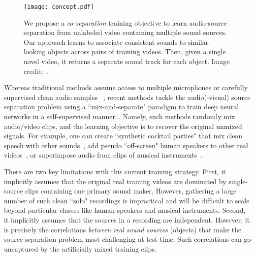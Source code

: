 \documentclass[10pt,twocolumn,letterpaper]{article}
\begin{document}
\begin{figure}
	\centering
	\texttt{[image: concept.pdf]}
	\caption{We propose a \emph{co-separation} training objective to learn audio-source separation from unlabeled video containing multiple sound sources.  Our approach learns to associate consistent sounds to similar-looking objects across pairs of training videos.  Then, given a single novel video, it returns a separate sound track for each object. Image credit:~\cite{video1,video2}.}
	\label{fig:concept}
	\vspace*{-0.15in}
\end{figure}
 
Whereas traditional methods assume access to multiple microphones or carefully supervised clean audio samples
~\cite{hyvarinen2000independent,virtanen2007monaural,fevotte2009nonnegative}, recent methods tackle the audio(-visual) source separation problem using a ``mix-and-separate" paradigm to train deep neural networks in a self-supervised manner~\cite{simpson2015deep,yu2017permutation,ephrat2018looking,owens2018audio,zhao2018sound}. Namely, such methods randomly mix audio/video clips, and the learning objective is to recover the original unmixed signals. For example, one can create ``synthetic cocktail parties" that mix clean speech with other sounds~\cite{ephrat2018looking}, add pseudo ``off-screen" human speakers to other real videos~\cite{owens2018audio}, or superimpose audio from clips of musical instruments~\cite{zhao2018sound}.

There are two key limitations with this current training strategy. First, it implicitly assumes that the original real training videos are dominated by single-source clips containing one primary sound maker. However, gathering a large number of such clean ``solo" recordings is impractical and will be difficult to scale beyond particular classes like human speakers and musical instruments. Second, it implicitly assumes that the sources in a recording are independent. However, it is precisely the correlations \emph{between real sound sources} (objects) that make the source separation problem most challenging at test time.  Such correlations can go uncaptured by the artificially mixed training clips.
\end{document}
